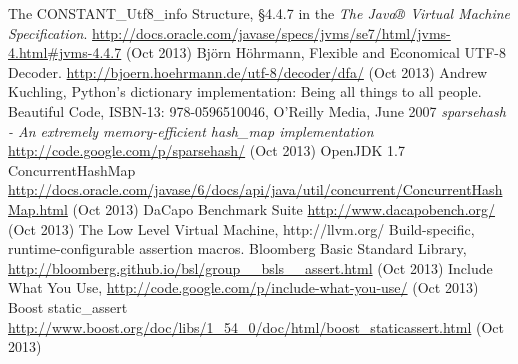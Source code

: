 \documentclass[12pt,a4paper,oneside]{article}
\begin{document}

\begin{thebibliography}{99}
		The CONSTANT\_Utf8\_info Structure, §4.4.7 in the \emph{The Java® Virtual Machine Specification}.
		\url{http://docs.oracle.com/javase/specs/jvms/se7/html/jvms-4.html#jvms-4.4.7} (Oct 2013)
		Bj\"{o}rn H\"{o}hrmann,
		Flexible and Economical UTF-8 Decoder.
		\url{http://bjoern.hoehrmann.de/utf-8/decoder/dfa/} (Oct 2013)
		Andrew Kuchling,
		Python's dictionary implementation: Being all things to all people.
		Beautiful Code, ISBN-13: 978-0596510046, O'Reilly Media, June 2007
		\emph{sparsehash - An extremely memory-efficient hash\_map implementation}
		\url{http://code.google.com/p/sparsehash/} (Oct 2013)
		OpenJDK 1.7 ConcurrentHashMap
		\url{http://docs.oracle.com/javase/6/docs/api/java/util/concurrent/ConcurrentHashMap.html} (Oct 2013)
		DaCapo Benchmark Suite
		\url{http://www.dacapobench.org/} (Oct 2013)
		The Low Level Virtual Machine,
		http://llvm.org/
		Build-specific, runtime-configurable assertion macros.
		Bloomberg Basic Standard Library,
		\url{http://bloomberg.github.io/bsl/group__bsls__assert.html} (Oct 2013)
		Include What You Use,
		\url{http://code.google.com/p/include-what-you-use/} (Oct 2013)
		Boost static\_assert
		\url{http://www.boost.org/doc/libs/1_54_0/doc/html/boost_staticassert.html} (Oct 2013)
\end{thebibliography}
\end{document}
